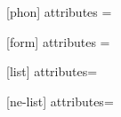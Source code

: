 \usepackage{german}

\usepackage{./styles/abbrev}



\usepackage{langsci-gb4e} 








\usepackage{./styles/additional-langsci-index-shortcuts}

\usepackage{langsci-avm}

[phon]
  {
    attributes  = \itshape%
}

[form]
  {
    attributes  = \itshape%
}

[list]{ attributes=\itshape } %



[ne-list]{ attributes=\itshape } %



